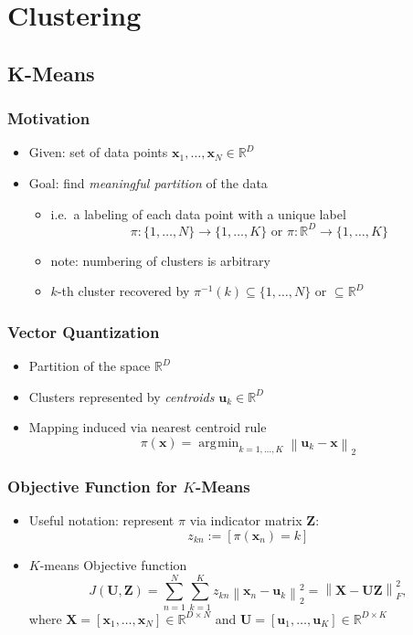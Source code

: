 \documentclass[11pt,a4paper,technote]{IEEEtran}
\DeclareMathOperator*{\argmin}{\arg\!\min}
\newcommand{\iver}[1]{\left[#1\right]}
\newcommand{\norm}[1]{\left\lVert#1\right\rVert}
\newcommand{\matr}[1]{\boldsymbol{\mathbf{#1}}}
\newcommand{\vect}[1]{\boldsymbol{\mathbf{#1}}}
\newcommand{\R}{\mathbb{R}}
\begin{document}
\section*{Clustering}
\subsection*{K-Means}
\subsubsection*{Motivation}
\begin{itemize}
  \item Given: set of data points $\vect{x}_1, \ldots, \vect{x}_N \in \R^D$
  \item Goal: find \emph{meaningful partition} of the data
    \begin{itemize}
      \item i.e.\ a labeling of each data point with a unique label
        \[
          \pi: \{1,\ldots,N\} \to \{1,\ldots,K\} \text{ or }
          \pi: \R^D \to \{1,\ldots,K\}
        \]
      \item note: numbering of clusters is arbitrary
      \item $k$-th cluster recovered by $\pi^{-1}(k) \subseteq \{1,\ldots,N\}$
        or $\subseteq \R^D$
    \end{itemize}
\end{itemize}

\subsubsection*{Vector Quantization}
\begin{itemize}
  \item Partition of the space $\R^D$
  \item Clusters represented by \emph{centroids} $\vect{u}_k \in \R^D$
  \item Mapping induced via nearest centroid rule
    \[ \pi(\vect{x}) = \argmin_{k=1,\ldots,K} \norm{\vect{u}_k - \vect{x}}_2 \]
\end{itemize}

\subsubsection*{Objective Function for $K$-Means}
\begin{itemize}
  \item Useful notation: represent $\pi$ via indicator matrix $\matr{Z}$:
    \[ z_{kn} := \iver{\pi(\vect{x}_n) = k} \]
  \item $K$-means Objective function
    \[
      J(\matr{U},\matr{Z}) = \sum_{n=1}^N \sum_{k=1}^K z_{kn} \norm{\vect{x}_n
        - \vect{u}_k}_2^2 = \norm{\matr{X} - \matr{U}\matr{Z}}_F^2,
    \]
    where $\matr{X} = [\vect{x}_1,\ldots,\vect{x}_N] \in \R^{D \times N}$
    and   $\matr{U} = [\vect{u}_1,\ldots,\vect{u}_K] \in \R^{D \times K}$
\end{itemize}
\end{document}
